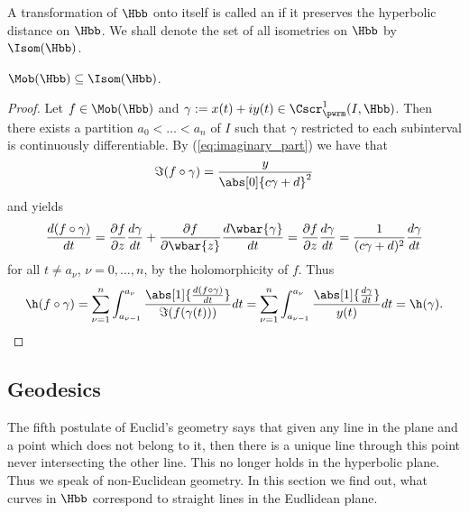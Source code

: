 \begin{definition}[Isometries]
	A transformation of $\Hbb$ onto itself is called an  if it preserves the hyperbolic distance on $\Hbb$. We shall denote the set of all isometries on $\Hbb$ by $\Isom(\Hbb)$.
\end{definition}

\begin{proposition}
	$\Mob(\Hbb) \subseteq \Isom(\Hbb)$.
	\label{prop:inclusion}
\end{proposition}

\begin{proof}
	Let $f \in \Mob(\Hbb)$ and $\gamma := x(t) + iy(t) \in \Cscr^1_\pwrm(I,\Hbb)$. Then there exists a partition $a_0 < \dots < a_n$ of $I$ such that $\gamma$ restricted to each subinterval is continuously differentiable. By (\ref{eq:imaginary_part}) we have that
	\begin{equation*}
		\Im(f \circ \gamma) = \frac{y}{\abs[0]{c\gamma + d}^2}
	\end{equation*}
	\noindent and \cite[25]{lieb:funktionentheorie:2003} yields
	\begin{equation*}
		\frac{d(f \circ \gamma)}{dt} = \frac{\partial f}{\partial z}\frac{d\gamma}{dt} + \frac{\partial f}{\partial \wbar{z}}\frac{d\wbar{\gamma}}{dt} = \frac{\partial f}{\partial z}\frac{d\gamma}{dt} = \frac{1}{(c\gamma + d)^2}\frac{d\gamma}{dt}
	\end{equation*}
	\noindent for all $t \neq a_\nu$, $\nu = 0,\dots,n$, by the holomorphicity of $f$. Thus
	\begin{equation*}
		\h(f \circ \gamma) =  \sum_{\nu = 1}^n \int_{a_{\nu - 1}}^{a_{\nu}} \frac{\abs[1]{\frac{d(f \circ \gamma)}{dt}}}{\Im(f(\gamma(t)))}dt = \sum_{\nu = 1}^n\int_{a_{\nu - 1}}^{a_\nu} \frac{\abs[1]{\frac{d\gamma}{dt}}}{y(t)}dt = \h(\gamma).
	\end{equation*}
\end{proof}

\subsection{Geodesics}
The fifth postulate of Euclid's geometry says that given any line in the plane and a point which does not belong to it, then there is a unique line through this point never intersecting the other line. This no longer holds in the hyperbolic plane. Thus we speak of non-Euclidean geometry. In this section we find out, what curves in $\Hbb$ correspond to straight lines in the Eudlidean plane.

